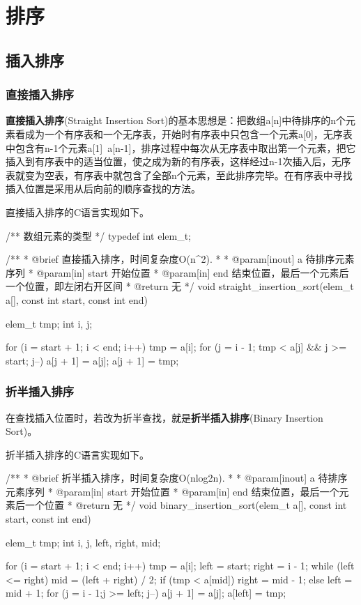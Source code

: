 \chapter{排序}

\section{插入排序} %


\subsection{直接插入排序}
\textbf{直接插入排序}(Straight Insertion Sort)的基本思想是：把数组a[n]中待排序的n个元素看成为一个有序表和一个无序表，开始时有序表中只包含一个元素a[0]，无序表中包含有n-1个元素a[1]~a[n-1]，排序过程中每次从无序表中取出第一个元素，把它插入到有序表中的适当位置，使之成为新的有序表，这样经过n-1次插入后，无序表就变为空表，有序表中就包含了全部n个元素，至此排序完毕。在有序表中寻找插入位置是采用从后向前的顺序查找的方法。

直接插入排序的C语言实现如下。
\begin{Codex}[label=straight_insertion_sort.c]
/** 数组元素的类型 */
typedef int elem_t;

/**
  * @brief 直接插入排序，时间复杂度O(n^2).
  *
  * @param[inout] a 待排序元素序列
  * @param[in] start 开始位置
  * @param[in] end 结束位置，最后一个元素后一个位置，即左闭右开区间
  * @return 无
  */
void straight_insertion_sort(elem_t a[], const int start, const int end) {
    elem_t tmp;
    int i, j;

    for (i = start + 1; i < end; i++) {
        tmp = a[i];
        for (j = i - 1; tmp < a[j] && j >= start; j--) {
            a[j + 1] = a[j];
        }
        a[j + 1] = tmp;
    }
}
\end{Codex}


\subsection{折半插入排序}
在查找插入位置时，若改为折半查找，就是\textbf{折半插入排序}(Binary Insertion Sort)。

折半插入排序的C语言实现如下。
\begin{Codex}[label=binary_insertion_sort.c]
/**
  * @brief 折半插入排序，时间复杂度O(nlog2n).
  *
  * @param[inout] a 待排序元素序列
  * @param[in] start 开始位置
  * @param[in] end 结束位置，最后一个元素后一个位置
  * @return 无
  */
void binary_insertion_sort(elem_t a[], const int start, const int end) {
    elem_t tmp;
    int i, j, left, right, mid;

    for (i = start + 1; i < end; i++) {
        tmp = a[i];
        left = start;
        right = i - 1;
        while (left <= right) {
            mid = (left + right) / 2;
            if (tmp < a[mid]) {
                right = mid - 1;
            } else {
                left = mid + 1;
            }
        }
        for (j = i - 1;j >= left; j--) {
            a[j + 1] = a[j];
        }
        a[left] = tmp;
    }
}
\end{Codex}


